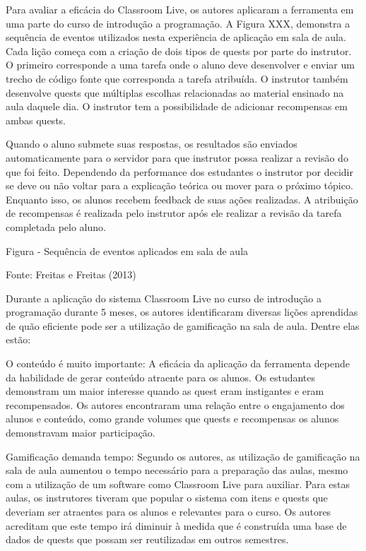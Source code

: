 \documentclass[
	12pt,				%
	oneside,			%
	a4paper,			%
	english,			%
	french,				%
	spanish,			%
	brazil,				%
	]{abntex2}
\begin{document}
Para avaliar a eficácia do Classroom Live, os autores aplicaram a ferramenta em uma parte do curso de introdução a programação. A Figura XXX, demonstra a sequência de eventos utilizados nesta experiência de aplicação em sala de aula. Cada lição começa com a criação de dois tipos de quests por parte do instrutor. O primeiro corresponde a uma tarefa onde o aluno deve desenvolver e enviar um trecho de código fonte que corresponda a tarefa atribuída. O instrutor também desenvolve quests que múltiplas escolhas relacionadas ao material ensinado na aula daquele dia. O instrutor tem a possibilidade de adicionar recompensas em ambas quests.

Quando o aluno submete suas respostas, os resultados são enviados automaticamente para o servidor para que instrutor possa realizar a revisão do que foi feito. Dependendo da performance dos estudantes o instrutor por decidir se deve ou não voltar para a explicação teórica ou mover para o próximo tópico. Enquanto isso, os alunos recebem feedback de suas ações realizadas. A atribuição de recompensas é realizada pelo instrutor após ele realizar a revisão da tarefa completada pelo aluno.



Figura - Sequência de eventos aplicados em sala de aula

Fonte: Freitas e Freitas (2013)

Durante a aplicação do sistema Classroom Live no curso de introdução a programação durante 5 meses, os autores identificaram diversas lições aprendidas de quão eficiente pode ser a utilização de gamificação na sala de aula. Dentre elas estão:

O conteúdo é muito importante: A eficácia da aplicação da ferramenta depende da habilidade de gerar conteúdo atraente para os alunos. Os estudantes demonstram um maior interesse quando as quest eram instigantes e eram recompensados. Os autores encontraram uma relação entre o engajamento dos alunos e conteúdo, como grande volumes que quests e recompensas os alunos demonstravam maior participação.

Gamificação demanda tempo: Segundo os autores, as utilização de gamificação na sala de aula aumentou o tempo necessário para a preparação das aulas, mesmo com a utilização de um software como Classroom Live para auxiliar. Para estas aulas, os instrutores tiveram que popular o sistema com itens e quests que deveriam ser atraentes para os alunos e relevantes para o curso. Os autores acreditam que este tempo irá diminuir à medida que é construída uma base de dados de quests que possam ser reutilizadas em outros semestres.
\end{document}
